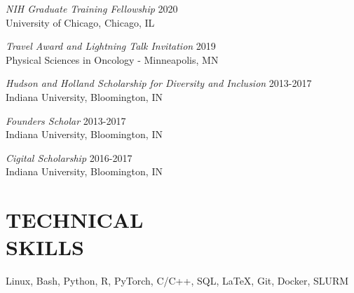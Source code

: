 \documentclass[margin, 10pt]{res} %
\begin{document}
\begin{resume}
{\sl NIH Graduate Training Fellowship} \hfill 2020 \\
University of Chicago, Chicago, IL

{\sl Travel Award and Lightning Talk Invitation} \hfill 2019 \\
Physical Sciences in Oncology - Minneapolis, MN

{\sl Hudson and Holland Scholarship for Diversity and Inclusion} \hfill 2013-2017 \\
Indiana University, Bloomington, IN 

{\sl Founders Scholar} \hfill 2013-2017 \\
Indiana University, Bloomington, IN 

{\sl Cigital Scholarship} \hfill 2016-2017 \\
Indiana University, Bloomington, IN 


\section{TECHNICAL \\ SKILLS} 

Linux, Bash, Python, R, PyTorch, C/C++, SQL, LaTeX, Git, Docker, SLURM\\

\end{resume}
\end{document}
